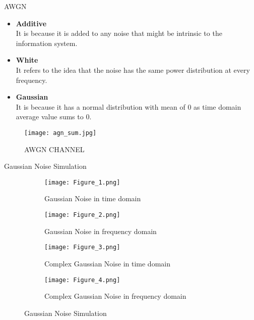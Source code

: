 \documentclass{beamer}
\begin{document}
\begin{frame}{AWGN}

\begin{block}{}
\begin{itemize}
    \item \textbf{Additive}\\ It is because it is added to any noise that might be intrinsic to the information system.
    \item \textbf{White}\\ It refers to the idea that the noise has the same power distribution at every frequency.
    \item \textbf{Gaussian}\\It is because it has a normal distribution with mean of 0 as time domain average value sums to 0.

\end{itemize}
\end{block}
\begin{figure}
    \centering
    \texttt{[image: agn\_sum.jpg]}
    \caption{AWGN CHANNEL}
    \label{fig:1}
\end{figure}

\end{frame}

\begin{frame}{Gaussian Noise Simulation}

\begin{figure}[H]
	\centering
	\begin{subfigure}{.3\textwidth}
	    \texttt{[image: Figure\_1.png]}
		\caption{Gaussian Noise in time domain}
	\end{subfigure}
	\begin{subfigure}{.3\textwidth}
		\texttt{[image: Figure\_2.png]}
		\caption{Gaussian Noise in frequency domain}
	\end{subfigure}
	\begin{subfigure}{.3\textwidth}
		\texttt{[image: Figure\_3.png]}
		\caption{Complex Gaussian Noise in time domain}
	\end{subfigure}
		\begin{subfigure}{.3\textwidth}
		\texttt{[image: Figure\_4.png]}
		\caption{Complex Gaussian Noise in frequency domain}
	\end{subfigure}
	\caption{ Gaussian Noise Simulation }
\end{figure}
\end{frame}
\end{document}
